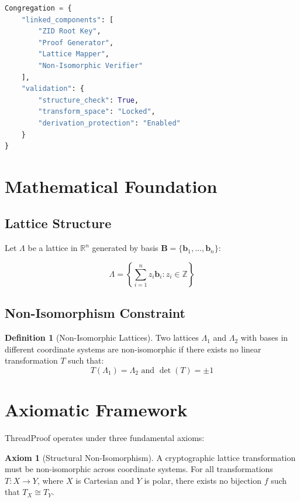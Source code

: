 \documentclass[11pt]{article}
\theoremstyle{definition}
\newtheorem{definition}{Definition}[section]
\newtheorem{axiom}{Axiom}[section]
\begin{document}
\begin{lstlisting}[language=Python, caption=Congregation Linker Structure]
Congregation = {
    "linked_components": [
        "ZID Root Key",
        "Proof Generator",
        "Lattice Mapper",
        "Non-Isomorphic Verifier"
    ],
    "validation": {
        "structure_check": True,
        "transform_space": "Locked",
        "derivation_protection": "Enabled"
    }
}
\end{lstlisting}

\section{Mathematical Foundation}

\subsection{Lattice Structure}

Let $\Lambda$ be a lattice in $\mathbb{R}^n$ generated by basis $\mathbf{B} = \{\mathbf{b}_1, \ldots, \mathbf{b}_n\}$:

$$\Lambda = \left\{ \sum_{i=1}^{n} z_i \mathbf{b}_i : z_i \in \mathbb{Z} \right\}$$

\subsection{Non-Isomorphism Constraint}

\begin{definition}[Non-Isomorphic Lattices]
Two lattices $\Lambda_1$ and $\Lambda_2$ with bases in different coordinate systems are non-isomorphic if there exists no linear transformation $T$ such that:
$$T(\Lambda_1) = \Lambda_2 \text{ and } \det(T) = \pm 1$$
\end{definition}

\section{Axiomatic Framework}

ThreadProof operates under three fundamental axioms:

\begin{axiom}[Structural Non-Isomorphism]
\label{ax:non-iso}
A cryptographic lattice transformation must be non-isomorphic across coordinate systems. For all transformations $T: X \rightarrow Y$, where $X$ is Cartesian and $Y$ is polar, there exists no bijection $f$ such that $T_X \cong T_Y$.
\end{axiom}
\end{document}
